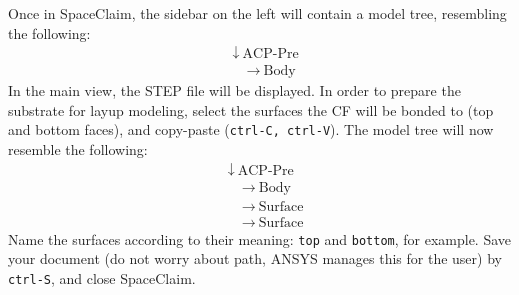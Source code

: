 \documentclass{amsdtx}
\begin{document}
Once in SpaceClaim, the sidebar on the left will contain a model tree, resembling the following:
\begin{align*}
	&\downarrow ~\text{ACP-Pre} \\
	&\quad\rightarrow~\text{Body}
\end{align*}
In the main view, the STEP file will be displayed. In order to prepare the substrate for layup modeling, select the surfaces the CF will be bonded to (top and bottom faces), and copy-paste (\verb|ctrl-C, ctrl-V|). The model tree will now resemble the following:
\begin{align*}
	&\downarrow ~\text{ACP-Pre} \\
	&\quad\rightarrow~\text{Body}\\
	&\quad\rightarrow~\text{Surface}\\
	&\quad\rightarrow~\text{Surface}
\end{align*}
Name the surfaces according to their meaning: \verb|top| and \verb|bottom|, for example. Save your document (do not worry about path, ANSYS manages this for the user) by \verb|ctrl-S|, and close SpaceClaim.\\
\end{document}
